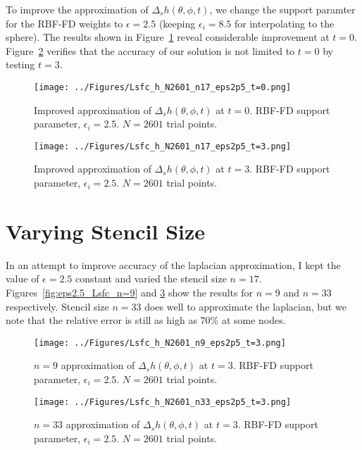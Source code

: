 \documentclass[letter,10pt]{article}
\begin{document}
To improve the approximation of $\Delta_{s} h(\theta,\phi,t)$, we change the support paramter for the RBF-FD weights to $\epsilon=2.5$ (keeping $\epsilon_{i} = 8.5$ for interpolating to the sphere). The results shown in Figure~\ref{fig:eps2.5_Lsfc_at_t=0} reveal considerable improvement at $t=0$. Figure~\ref{fig:eps2.5_Lsfc_at_t=3} verifies that the accuracy of our solution is not limited to $t=0$ by testing $t=3$. 

\begin{figure}[h]
\begin{center}
\texttt{[image: ../Figures/Lsfc\_h\_N2601\_n17\_eps2p5\_t=0.png]}
\caption{Improved approximation of $\Delta_{s} h(\theta,\phi,t)$ at $t=0$. RBF-FD support parameter, $\epsilon_{i}=2.5$. $N=2601$ trial points. }
\label{fig:eps2.5_Lsfc_at_t=0}
\end{center}
\end{figure}

\begin{figure}[h]
\begin{center}
\texttt{[image: ../Figures/Lsfc\_h\_N2601\_n17\_eps2p5\_t=3.png]}
\caption{Improved approximation of $\Delta_{s} h(\theta,\phi,t)$ at $t=3$. RBF-FD support parameter, $\epsilon_{i}=2.5$. $N=2601$ trial points. }
\label{fig:eps2.5_Lsfc_at_t=3}
\end{center}
\end{figure}

\clearpage

\section{Varying Stencil Size}

In an attempt to improve accuracy of the laplacian approximation, I kept the value of $\epsilon=2.5$ constant and varied the stencil size $n=17$. Figures~\ref{fig:eps2.5_Lsfc_n=9} and \ref{fig:eps2.5_Lsfc_n=33} show the results for $n=9$ and $n=33$ respectively. Stencil size $n=33$ does well to approximate the laplacian, but we note that the relative error is still as high as 70\% at some nodes.  

\begin{figure}[h]
\begin{center}
\texttt{[image: ../Figures/Lsfc\_h\_N2601\_n9\_eps2p5\_t=3.png]}
\caption{$n=9$ approximation of $\Delta_{s} h(\theta,\phi,t)$ at $t=3$. RBF-FD support parameter, $\epsilon_{i}=2.5$. $N=2601$ trial points. }
\label{fig:eps2.5_Lsfc_n=9}
\texttt{[image: ../Figures/Lsfc\_h\_N2601\_n33\_eps2p5\_t=3.png]}
\caption{$n=33$ approximation of $\Delta_{s} h(\theta,\phi,t)$ at $t=3$. RBF-FD support parameter, $\epsilon_{i}=2.5$. $N=2601$ trial points. }
\label{fig:eps2.5_Lsfc_n=33}
\end{center}
\end{figure}
\end{document}
